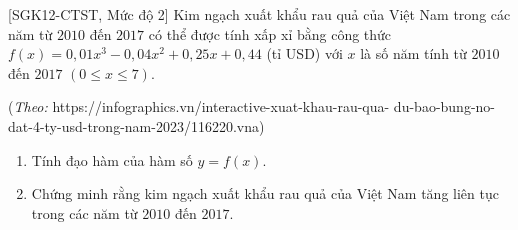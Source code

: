 \begin{bt}%
[SGK12-CTST, Mức độ 2]
	Kim ngạch xuất khẩu rau quả của Việt Nam trong các năm từ $2010$ đến $2017$ có thể được tính xấp xỉ bằng công thức $f(x)=0{,}01x^3-0{,}04x^2+0{,}25x+0{,}44$ (tỉ USD) với $x$ là số năm tính từ $2010$ đến $2017$ $(0\leq x\leq 7)$.
	\begin{flushright}
		(\textit{Theo:} https://infographics.vn/interactive-xuat-khau-rau-qua-
		du-bao-bung-no-dat-4-ty-usd-trong-nam-2023/116220.vna)
	\end{flushright}
	\begin{enumerate}
		\item Tính đạo hàm của hàm số $y=f(x)$.
		\item Chứng minh rằng kim ngạch xuất khẩu rau quả của Việt Nam tăng liên tục trong các năm từ $2010$ đến $2017$.
	\end{enumerate}
\end{bt}

